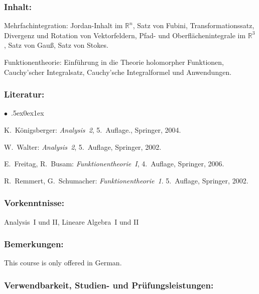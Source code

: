 \documentclass[a4paper,10pt]{article}
\renewenvironment{itemize}{\begin{list}{$\bullet$\ }{\itemsep.5ex\setlength{\topsep}{0.5\itemsep}\parsep0ex\labelsep1ex\settowidth{\labelwidth}{$\bullet$\ }\setlength{\leftmargin}{\labelwidth}\addtolength{\leftmargin}{3ex}\addtolength{\leftmargin}{\labelsep}}}{\end{list}}
\begin{document}
\subsubsection*{\large
    Inhalt:
}
Mehrfachintegration: Jordan-Inhalt im $\mathbb R^n$, Satz von Fubini, Transformationssatz, Divergenz und Rotation von Vektorfeldern, Pfad- und Oberflächenintegrale im $\mathbb R^3$, Satz von Gauß, Satz von Stokes.

Funktionentheorie: Einführung in die Theorie holomorpher Funktionen, Cauchy’scher Integralsatz, Cauchy’sche Integralformel und Anwendungen.
\subsubsection*{\large
    Literatur:
}
\begin{itemize}
\item
K.~Königsberger: \emph{Analysis~2}, 5.~Auflage., Springer, 2004.
\item
W.~Walter: \emph{Analysis~2}, 5.~Auflage, Springer, 2002.
\item
E.~Freitag, R.~Busam: \emph{Funktionentheorie~I}, 4.~Auflage, Springer, 2006.
\item
R.~Remmert, G.~Schumacher: \emph{Funktionentheorie~1}. 5.~Auflage, Springer, 2002.
\end{itemize}
\subsubsection*{\large
    Vorkenntnisse:
}
Analysis~I und II, Lineare Algebra~I und II
\subsubsection*{\large
    Bemerkungen:
}
This course is only offered in German.
\subsubsection*{\large
    Verwendbarkeit, Studien- und Prüfungsleistungen:
}
\end{document}
